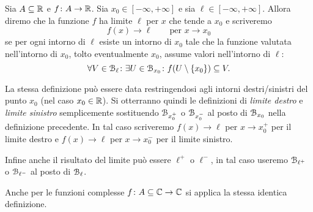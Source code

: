 % 
% 
% 

\begin{definition}
\mymark{***}
Sia $A\subseteq {\mathbb R}$ e $f\colon A \to {\mathbb R}$. 
Sia $x_0\in [-\infty,+\infty]$
e sia $\ell \in [-\infty,+\infty]$.
Allora diremo che la funzione $f$ ha limite $\ell$ per $x$ che tende a $x_0$ 
e scriveremo%
\[
  f(x) \to \ell \qquad \text{per $x\to x_0$}
\]
se per ogni intorno di $\ell$ esiste un intorno di $x_0$ tale che
la funzione valutata nell'intorno di $x_0$, tolto eventualmente $x_0$,
assume valori
nell'intorno di $\ell$:
\begin{equation}\label{eq:def_limite}
  \forall V \in \mathcal B_\ell \colon \exists U \in \mathcal B_{x_0} \colon f(U\setminus{\left\{ x_0 \right\}}) \subseteq V.
\end{equation}

La stessa definizione può essere data restringendosi agli intorni destri/sinistri del punto $x_0$ (nel caso $x_0 \in {\mathbb R}$). Si otterranno quindi le definizioni
di \emph{limite destro} e \emph{limite sinistro}
%
semplicemente sostituendo $\mathcal B_{x_0^+}$ o $\mathcal B_{x_0^-}$ al posto di 
$\mathcal B_{x_0}$ nella definizione
precedente. 
In tal caso scriveremo $f(x)\to \ell$ per $x\to x_0^+$ per il limite 
destro e $f(x)\to \ell$ per $x\to x_0^-$ per il limite sinistro.

Infine anche il risultato del limite può essere $\ell^+$ o $\ell^-$, 
in tal caso useremo $\mathcal B_{\ell^+}$ o $\mathcal B_{\ell^-}$ 
al posto di $\mathcal B_{\ell}$.

Anche per le funzioni complesse $f\colon A\subseteq {\mathbb C} \to {\mathbb C}$ 
si applica la stessa identica definizione.
\end{definition}
  
